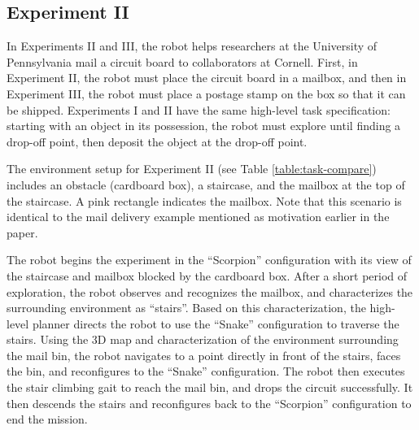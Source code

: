 \documentclass[journal]{IEEEtran}
\begin{document}
\subsection{Experiment II}
%
In Experiments II and III, the robot helps researchers at the University of Pennsylvania mail a circuit board to collaborators at Cornell.  First, in Experiment II, the robot must place the circuit board in a mailbox, and then in Experiment III, the robot must place a postage stamp on the box so that it can be shipped.  Experiments I and II have the same high-level task specification: starting with an object in its possession, the robot must explore until finding a drop-off point, then deposit the object at the drop-off point.



The environment setup for Experiment II (see Table \ref{table:task-compare}) includes an obstacle (cardboard box), a staircase, and the mailbox at the top of the staircase.  A pink rectangle indicates the mailbox.  Note that this scenario is identical to the mail delivery example mentioned as motivation earlier in the paper.

The robot begins the experiment in the ``Scorpion'' configuration with its view of the staircase and mailbox blocked by the cardboard box.  After a short period of exploration, the robot observes and recognizes the mailbox, and characterizes the surrounding environment as ``stairs''. Based on this characterization, the high-level planner directs the robot to use the ``Snake'' configuration to traverse the stairs. Using the 3D map and characterization of the environment surrounding the mail bin, the robot navigates to a point directly in front of the stairs, faces the bin, and reconfigures to the ``Snake'' configuration. The robot then executes the stair climbing gait to reach the mail bin, and drops the circuit successfully. It then descends the stairs and reconfigures back to the ``Scorpion'' configuration to end the mission.
\end{document}
